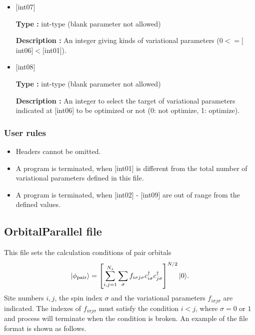 \begin{itemize}
  {\bf Description :} When the mode of the anti-periodic condition turns on (the mode turns on when the value of \verb|NMPTrans| in \verb|ModPara| file is negative), the sign of $f_{ij}$ is specified by setting $[$int06$]=\pm1$. This term can be omitted when the mode of the anti-periodic condition is off.

 \item  $[$int07$]$
   
   {\bf Type :} int-type (blank parameter not allowed)

  {\bf Description :} An integer giving kinds of variational  parameters ($0<= [$int06$]<[$int01]).   
 \item  $[$int08$]$
   
   {\bf Type :} int-type (blank parameter not allowed)

  {\bf Description :} An integer to select the target of variational parameters indicated at [int06] to be optimized or not (0: not optimize, 1: optimize).
  
  
\end{itemize}

\subsubsection{User rules}
\begin{itemize}
\item Headers cannot be omitted. 
\item A program is terminated, when $[$int01$]$ is different from the total number of variational parameters defined in this file.
\item A program is terminated, when $[$int02$]$ - $[$int09$]$ are out of range from the defined values.
\end{itemize}

\newpage
\subsection{OrbitalParallel file}
\label{Subsec:OrbitalaParallel}
This file sets the calculation conditions of pair orbitals
\begin{equation}
|\phi_{\rm pair} \rangle = \left[\sum_{i, j=1}^{N_s} \sum_{\sigma}f_{i\sigma j\sigma}c_{i\sigma}^{\dag}c_{j\sigma}^{\dag} \right]^{N/2}|0 \rangle.
\end{equation}
Site numbers $i, j$, the spin index $\sigma$ and the variational parameters $f_{i\sigma j\sigma}$ are indicated.
The indexes of $f_{i\sigma j\sigma}$  must satisfy the condition $i < j $, where $\sigma = 0$ or $1$ and 
process will terminate when the condition is broken.
An example of the file format is shown as follows.


